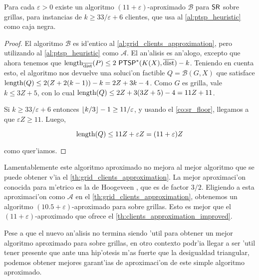 \begin{theorem}
\label{th:clients_approximation_improved}
Para cada $\varepsilon > 0$ existe un algoritmo $(11 + \varepsilon)$-aproximado $\mathcal{B}$ para $\textnormal{\textsf{SR}}$ sobre grillas, para instancias de $k \geq 33 / \varepsilon + 6$ clientes, que usa al \autoref{al:ptsp_heuristic} como caja negra.

\begin{proof}
El algoritmo $\mathcal{B}$ es id'entico al \autoref{al:grid_clients_approximation}, pero utilizando al \autoref{al:ptsp_heuristic} como $\mathcal{A}$. El an'alisis es an'alogo, excepto que ahora tenemos que $\textnormal{length}_{\overline{\textnormal{dist}}}(P) \leq 2 \text{ } \textnormal{\textsf{PTSP}}^*(K(X), \overline{\textnormal{dist}}) - k$. Teniendo en cuenta esto, el algoritmo nos devuelve una soluci'on factible $Q = \mathcal{B}(G, X)$ que satisface $\textnormal{length}(Q) \leq 2(Z + 2(k - 1)) - k = 2Z + 3k - 4$. Como $G$ es grilla, vale $k \leq 3Z + 5$, con lo cual $\textnormal{length}(Q) \leq 2Z + 3(3Z + 5) - 4 = 11Z + 11$.

Si $k \geq 33 / \varepsilon + 6$ entonces $\left\lfloor k / 3 \right\rfloor - 1 \geq 11  / \varepsilon$, y usando el \autoref{co:sr_floor}, llegamos a que $\varepsilon Z \geq 11$. Luego,

\[\textnormal{length}(Q) \leq 11 Z + \varepsilon Z = (11 + \varepsilon) Z\]

\noindent
como quer'iamos.
\end{proof}
\end{theorem}

Lamentablemente este algoritmo aproximado no mejora al mejor algoritmo que se puede obtener v'ia el \autoref{th:grid_clients_approximation}. La mejor aproximaci'on conocida para  m'etrico es la de Hoogeveen \cite{Ho91}, que es de factor $3/2$. Eligiendo a esta aproximaci'on como $\mathcal{A}$ en el \autoref{th:grid_clients_approximation}, obtenemos un algoritmo $(10.5 + \varepsilon)$-aproximado para  sobre grillas. Esto es mejor que el $(11 + \varepsilon)$-aproximado que ofrece el \autoref{th:clients_approximation_improved}.

Pese a que el nuevo an'alisis no termina siendo 'util para obtener un mejor algoritmo aproximado para  sobre grillas, en otro contexto podr'ia llegar a ser 'util tener presente que ante una hip'otesis m'as fuerte que la desigualdad triangular, podemos obtener mejores garant'ias de aproximaci'on de este simple algoritmo aproximado.
